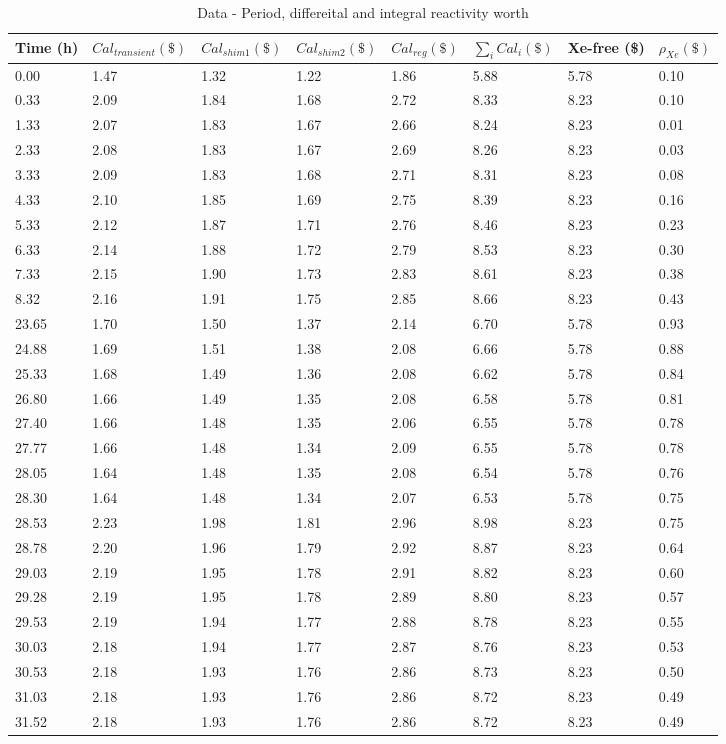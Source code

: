\begin{table}[!htb]
    \centering
\begin{tabular}{llllllll}
Time (h) & $Cal_{transient} (\$)$ & $Cal_{shim1} (\$)$ & $Cal_{shim2} (\$)$ & $Cal_{reg} (\$)$ & $\sum_i{Cal_i} (\$)$ & Xe-free (\$) & $\rho_{Xe} (\$)$ \\\hline\hline
0.00  & 1.47 & 1.32 & 1.22 & 1.86 & 5.88 & 5.78   & 0.10 \\
0.33  & 2.09 & 1.84 & 1.68 & 2.72 & 8.33 & 8.23   & 0.10 \\
1.33  & 2.07 & 1.83 & 1.67 & 2.66 & 8.24 & 8.23   & 0.01 \\
2.33  & 2.08 & 1.83 & 1.67 & 2.69 & 8.26 & 8.23   & 0.03 \\
3.33  & 2.09 & 1.83 & 1.68 & 2.71 & 8.31 & 8.23   & 0.08 \\
4.33  & 2.10 & 1.85 & 1.69 & 2.75 & 8.39 & 8.23   & 0.16 \\
5.33  & 2.12 & 1.87 & 1.71 & 2.76 & 8.46 & 8.23   & 0.23 \\
6.33  & 2.14 & 1.88 & 1.72 & 2.79 & 8.53 & 8.23   & 0.30 \\
7.33  & 2.15 & 1.90 & 1.73 & 2.83 & 8.61 & 8.23   & 0.38 \\
8.32  & 2.16 & 1.91 & 1.75 & 2.85 & 8.66 & 8.23   & 0.43 \\
23.65 & 1.70 & 1.50 & 1.37 & 2.14 & 6.70 & 5.78 & 0.93 \\
24.88 & 1.69 & 1.51 & 1.38 & 2.08 & 6.66 & 5.78 & 0.88 \\
25.33 & 1.68 & 1.49 & 1.36 & 2.08 & 6.62 & 5.78 & 0.84 \\
26.80 & 1.66 & 1.49 & 1.35 & 2.08 & 6.58 & 5.78 & 0.81 \\
27.40 & 1.66 & 1.48 & 1.35 & 2.06 & 6.55 & 5.78 & 0.78 \\
27.77 & 1.66 & 1.48 & 1.34 & 2.09 & 6.55 & 5.78 & 0.78 \\
28.05 & 1.64 & 1.48 & 1.35 & 2.08 & 6.54 & 5.78 & 0.76 \\
28.30 & 1.64 & 1.48 & 1.34 & 2.07 & 6.53 & 5.78 & 0.75 \\
28.53 & 2.23 & 1.98 & 1.81 & 2.96 & 8.98 & 8.23 & 0.75 \\
28.78 & 2.20 & 1.96 & 1.79 & 2.92 & 8.87 & 8.23 & 0.64 \\
29.03 & 2.19 & 1.95 & 1.78 & 2.91 & 8.82 & 8.23 & 0.60 \\
29.28 & 2.19 & 1.95 & 1.78 & 2.89 & 8.80 & 8.23 & 0.57 \\
29.53 & 2.19 & 1.94 & 1.77 & 2.88 & 8.78 & 8.23 & 0.55 \\
30.03 & 2.18 & 1.94 & 1.77 & 2.87 & 8.76 & 8.23 & 0.53 \\
30.53 & 2.18 & 1.93 & 1.76 & 2.86 & 8.73 & 8.23 & 0.50 \\
31.03 & 2.18 & 1.93 & 1.76 & 2.86 & 8.72 & 8.23 & 0.49 \\
31.52 & 2.18 & 1.93 & 1.76 & 2.86 & 8.72 & 8.23 & 0.49
\end{tabular}
        \caption{Data - Period, differeital and integral reactivity worth}\label{tab:data}
\end{table}



\
